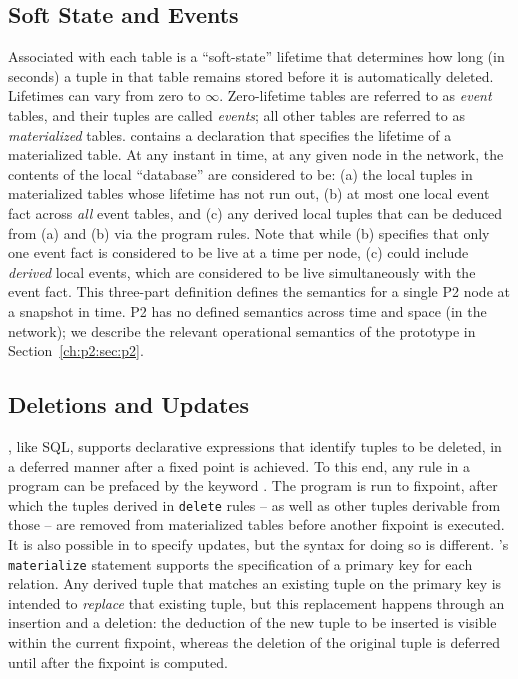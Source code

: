 \subsection{Soft State and Events}

Associated with each \OVERLOG table is a ``soft-state'' lifetime that
determines how long (in seconds) a tuple in that table remains stored before it
is automatically deleted.  Lifetimes can vary from zero to $\infty$.
Zero-lifetime tables are referred to as {\em event} tables, and their tuples
are called \emph{events}; all other tables are referred to as {\em
materialized} tables.  \OVERLOG contains a  declaration that
specifies the lifetime of a materialized table.  At any instant in time, at any
given node in the network, the contents of the local \OVERLOG ``database'' are
considered to be: (a) the local tuples in materialized tables whose lifetime
has not run out, (b) at most one local event fact across {\em all} event
tables, and (c) any derived local tuples that can be deduced from (a) and (b)
via the program rules.  Note that while (b) specifies that only one event fact
is considered to be live at a time per node, (c) could include {\em derived}
local events, which are considered to be live simultaneously with the event
fact.  This three-part definition defines the semantics for a single P2 node at
a snapshot in time.  P2 has no defined semantics across time and space (in the
network); we describe the relevant operational semantics of the prototype in
Section~\ref{ch:p2:sec:p2}.
     
\subsection{Deletions and Updates}

\OVERLOG, like SQL, supports declarative expressions that identify tuples to be
deleted, in a deferred manner after a fixed point is achieved. To this end, any
\OVERLOG rule in a program can be prefaced by the keyword .  The
program is run to fixpoint, after which the tuples derived in {\tt delete}
rules -- as well as other tuples derivable from those -- are removed from
materialized tables before another fixpoint is executed.  It is also possible
in \OVERLOG to specify updates, but the syntax for doing so is different.
\OVERLOG's {\tt materialize} statement supports the specification of a primary
key for each relation.  Any derived tuple that matches an existing tuple on the
primary key is intended to {\em replace} that existing tuple, but this
replacement happens through an insertion and a deletion: the deduction of the
new tuple to be inserted is visible within the current fixpoint, whereas the
deletion of the original tuple is deferred until after the fixpoint is computed.

